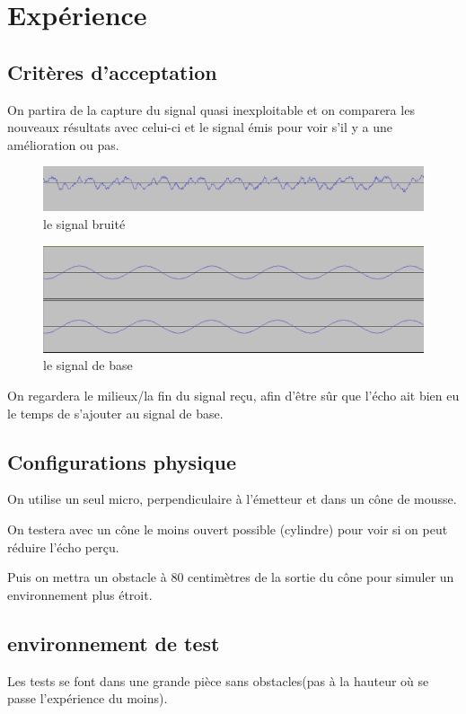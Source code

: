 \documentclass[12pt,a4paper]{report}
\begin{document}
\section{Expérience}
\subsection{Critères d'acceptation}
On partira de la capture du signal quasi inexploitable et on comparera les nouveaux résultats avec celui-ci et le signal émis pour voir s'il y a une amélioration ou pas.
\begin{figure}[H]
\includegraphics[width=\textwidth]{img/cone_90.png}
\caption{le signal bruité}
\end{figure}
\begin{figure}[H]
\includegraphics[width=\textwidth]{img/sinus_base.png}
\caption{le signal de base}
\end{figure}
On regardera le milieux/la fin du signal reçu, afin d'être sûr que l'écho ait bien eu le temps de s'ajouter au signal de base.


\subsection{Configurations physique}
On utilise un seul micro, perpendiculaire à l'émetteur et dans un cône de mousse.

On testera avec un cône le moins ouvert possible (cylindre) pour voir si on peut réduire l'écho perçu.

Puis on mettra un obstacle à 80 centimètres de la sortie du cône pour simuler un environnement plus étroit.

\subsection{environnement de test}
Les tests se font dans une grande pièce sans obstacles(pas à la hauteur où se passe l'expérience du moins).
\end{document}
